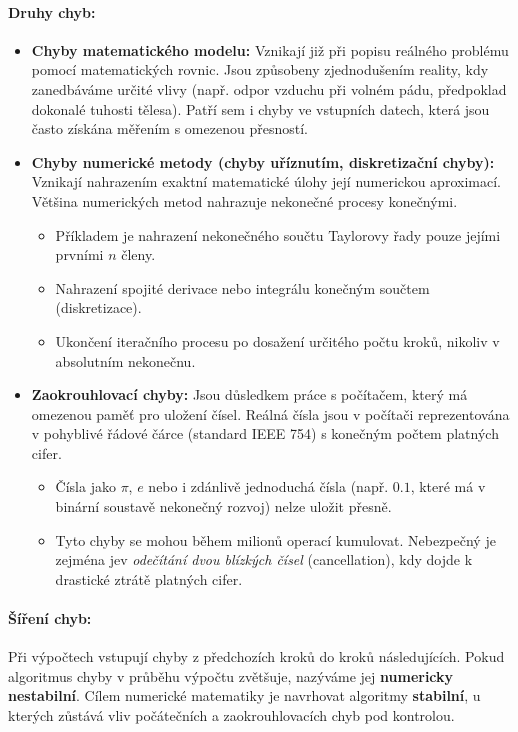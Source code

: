 \paragraph*{Druhy chyb:}
\begin{itemize}
    \item \textbf{Chyby matematického modelu:}
    Vznikají již při popisu reálného problému pomocí matematických rovnic. Jsou způsobeny zjednodušením reality, kdy zanedbáváme určité vlivy (např. odpor vzduchu při volném pádu, předpoklad dokonalé tuhosti tělesa). Patří sem i chyby ve vstupních datech, která jsou často získána měřením s omezenou přesností.

    \item \textbf{Chyby numerické metody (chyby uříznutím, diskretizační chyby):}
    Vznikají nahrazením exaktní matematické úlohy její numerickou aproximací. Většina numerických metod nahrazuje nekonečné procesy konečnými.
    \begin{itemize}
        \item Příkladem je nahrazení nekonečného součtu Taylorovy řady pouze jejími prvními $n$ členy.
        \item Nahrazení spojité derivace nebo integrálu konečným součtem (diskretizace).
        \item Ukončení iteračního procesu po dosažení určitého počtu kroků, nikoliv v absolutním nekonečnu.
    \end{itemize}

    \item \textbf{Zaokrouhlovací chyby:}
    Jsou důsledkem práce s počítačem, který má omezenou paměť pro uložení čísel. Reálná čísla jsou v počítači reprezentována v pohyblivé řádové čárce (standard IEEE 754) s konečným počtem platných cifer.
    \begin{itemize}
        \item Čísla jako $\pi$, $e$ nebo i zdánlivě jednoduchá čísla (např. $0.1$, které má v binární soustavě nekonečný rozvoj) nelze uložit přesně.
        \item Tyto chyby se mohou během milionů operací kumulovat. Nebezpečný je zejména jev \textit{odečítání dvou blízkých čísel} (cancellation), kdy dojde k drastické ztrátě platných cifer.
    \end{itemize}
\end{itemize}

\paragraph*{Šíření chyb:}
Při výpočtech vstupují chyby z předchozích kroků do kroků následujících. Pokud algoritmus chyby v průběhu výpočtu zvětšuje, nazýváme jej \textbf{numericky nestabilní}. Cílem numerické matematiky je navrhovat algoritmy \textbf{stabilní}, u kterých zůstává vliv počátečních a zaokrouhlovacích chyb pod kontrolou.


